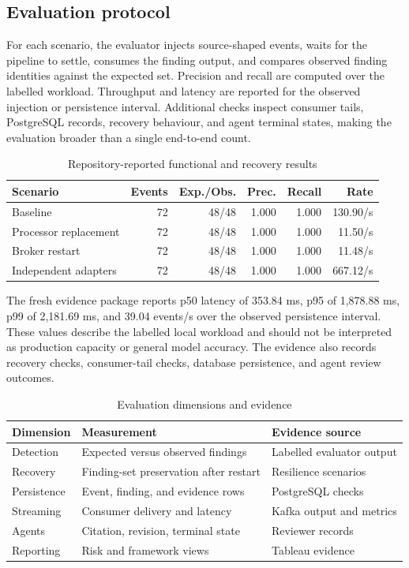 \documentclass[conference]{IEEEtran}
\begin{document}
\subsection{Evaluation protocol}
For each scenario, the evaluator injects source-shaped events, waits for the pipeline to settle, consumes the finding output, and compares observed finding identities against the expected set. Precision and recall are computed over the labelled workload. Throughput and latency are reported for the observed injection or persistence interval. Additional checks inspect consumer tails, PostgreSQL records, recovery behaviour, and agent terminal states, making the evaluation broader than a single end-to-end count.

\begin{table}[t]
\caption{Repository-reported functional and recovery results}
\label{tab:results}
\centering\scriptsize
\begin{tabular}{lrrrrr}
\toprule
\textbf{Scenario} & \textbf{Events} & \textbf{Exp./Obs.} & \textbf{Prec.} & \textbf{Recall} & \textbf{Rate}\\
\midrule
Baseline & 72 & 48/48 & 1.000 & 1.000 & 130.90/s\\
Processor replacement & 72 & 48/48 & 1.000 & 1.000 & 11.50/s\\
Broker restart & 72 & 48/48 & 1.000 & 1.000 & 11.48/s\\
Independent adapters & 72 & 48/48 & 1.000 & 1.000 & 667.12/s\\
\bottomrule
\end{tabular}
\end{table}

The fresh evidence package reports p50 latency of 353.84 ms, p95 of 1,878.88 ms, p99 of 2,181.69 ms, and 39.04 events/s over the observed persistence interval. These values describe the labelled local workload and should not be interpreted as production capacity or general model accuracy. The evidence also records recovery checks, consumer-tail checks, database persistence, and agent review outcomes.

\begin{table}[t]\caption{Evaluation dimensions and evidence}\label{tab:eval}\centering\scriptsize\begin{tabular}{p{1.7cm}p{2.5cm}p{2.15cm}}\toprule\textbf{Dimension} & \textbf{Measurement} & \textbf{Evidence source}\\\midrule Detection & Expected versus observed findings & Labelled evaluator output\\ Recovery & Finding-set preservation after restart & Resilience scenarios\\ Persistence & Event, finding, and evidence rows & PostgreSQL checks\\ Streaming & Consumer delivery and latency & Kafka output and metrics\\ Agents & Citation, revision, terminal state & Reviewer records\\ Reporting & Risk and framework views & Tableau evidence\\\bottomrule\end{tabular}\end{table}
\end{document}
